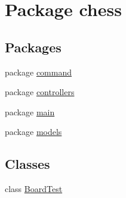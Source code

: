 \hypertarget{namespacechess}{}\section{Package chess}
\label{namespacechess}
\subsection*{Packages}
\begin{DoxyCompactItemize}
\item 
package \mbox{\hyperlink{namespacechess_1_1command}{command}}
\item 
package \mbox{\hyperlink{namespacechess_1_1controllers}{controllers}}
\item 
package \mbox{\hyperlink{namespacechess_1_1main}{main}}
\item 
package \mbox{\hyperlink{namespacechess_1_1models}{models}}
\end{DoxyCompactItemize}
\subsection*{Classes}
\begin{DoxyCompactItemize}
\item 
class \mbox{\hyperlink{classchess_1_1_board_test}{Board\+Test}}
\end{DoxyCompactItemize}
